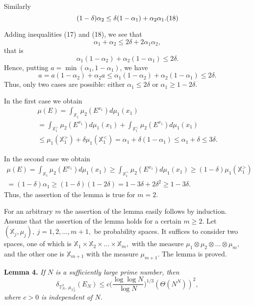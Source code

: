 \documentclass[12pt]{article}
\begin{document}
   Similarly
$$
(1-\delta)\alpha_2\leq \delta(1-\alpha_1)+\alpha_2\alpha_1.
\relax(18)
$$

  Adding inequalities (17) and (18), we see that
$$
\alpha_1+\alpha_2\leq 2\delta+2\alpha_1\alpha_2,
$$
that is
$$
\alpha_1(1-\alpha_2)+\alpha_2(1-\alpha_1)\leq 2\delta.
$$
Hence, putting $a=\min (\alpha_1, 1-\alpha_1)$, we have
$$
a=a(1-\alpha_2)+\alpha_2 a\leq
\alpha_1(1-\alpha_2)+\alpha_2(1-\alpha_1)\leq 2\delta.
$$
Thus, only two cases are possible: either $\alpha_1\leq 2\delta$
or $\alpha_1\geq 1-2\delta$.

   In the first case we obtain
\begin{multline*}
\mu(E)=\int_{\mathbb X_1}\mu_2(E^{x_1})d\mu_1(x_1)\\
=\int_{\mathbb X_1^>}\mu_2(E^{x_1})d\mu_1(x_1)+ \int_{\mathbb
X_1^<}\mu_2(E^{x_1})d\mu_1(x_1) \\ \leq \mu_1(\mathbb
X_1^>)+\delta\mu_1(\mathbb X_1^<)= \alpha_1+\delta(1-\alpha_1)\leq
\alpha_1+\delta\leq 3\delta.
\end{multline*}

  In the second case we obtain
\begin{multline*}
\mu(E)=\int_{\mathbb X_1}\mu_2(E^{x_1})d\mu_1(x_1)\geq
\int_{\mathbb X_1^>}\mu_2(E^{x_1})d\mu_1(x_1)\geq
(1-\delta)\mu_1(\mathbb X_1^>) \\ = (1-\delta)\alpha_1\geq
(1-\delta)(1-2\delta)= 1-3\delta+2\delta^2\geq 1-3\delta.
\end{multline*}
Thus, the assertion of the lemma is true for $m=2$.

   For an arbitrary $m$ the assertion of the lemma easily
follows by induction. Assume that the assertion of the lemma holds
for a certain $m\geq 2$. Let $(\mathbb X_j, \mu_j), ~j=1, 2,
\ldots, m+1,$ be probability spaces. It suffices to consider two
spaces, one of which is $\mathbb X_1\times\mathbb
X_2\times\ldots\times\mathbb X_m,$ with the measure
$\mu_1\otimes\mu_2\otimes\ldots\otimes\mu_m,$ and the other one is
$\mathbb X_{m+1}$ with the measure $\mu_{m+1}$. The lemma is
proved.

\quad

\textbf{Lemma 4.} \emph{If $N$ is a sufficiently large prime
number, then
$$
\delta_{\mathbb T_N^3, ~\mu_{\mathbb T_N^3}}(E_N)
\leq c\bigg(\frac{\log\log N}{\log N}\bigg)^{1/3}(\Theta(N^N))^2,
$$
where $c>0$ is independent of $N$.}

\quad
\end{document}

